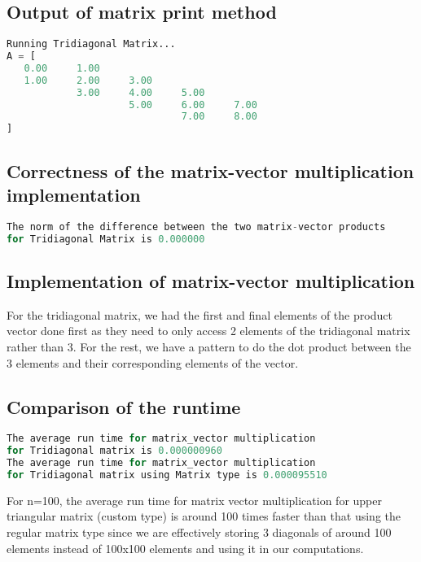 \documentclass{article}
\begin{document}
\subsection{Output of matrix print method} 
\begin{lstlisting}[language=awk]
Running Tridiagonal Matrix...
A = [
   0.00     1.00
   1.00     2.00     3.00
            3.00     4.00     5.00
                     5.00     6.00     7.00
                              7.00     8.00
]
\end{lstlisting}
\subsection{Correctness of the matrix-vector multiplication implementation}
\begin{lstlisting}[language=awk]
The norm of the difference between the two matrix-vector products 
for Tridiagonal Matrix is 0.000000    
\end{lstlisting}
\subsection{Implementation of matrix-vector multiplication}
For the tridiagonal matrix, we had the first and final elements of the product vector done first as they need to only access 2 elements of the tridiagonal matrix rather than 3. For the rest, we have a pattern to do the dot product between the 3 elements and their corresponding elements of the vector.
\subsection{Comparison of the runtime}
\begin{lstlisting}[language=awk]
The average run time for matrix_vector multiplication 
for Tridiagonal matrix is 0.000000960
The average run time for matrix_vector multiplication 
for Tridiagonal matrix using Matrix type is 0.000095510
\end{lstlisting}
For n=100, the average run time for matrix vector multiplication for upper triangular matrix (custom type) is around 100 times faster than that using the regular matrix type since we are effectively storing 3 diagonals of around 100 elements instead of 100x100 elements and using it in our computations. 
\end{document}
